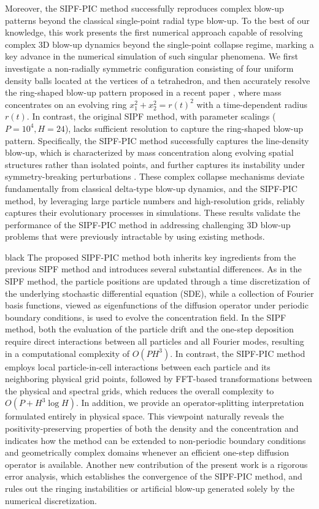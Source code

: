 \documentclass[review,onefignum,onetabnum]{siamart250211}
\begin{document}
Moreover, the SIPF-PIC method successfully reproduces complex blow-up patterns beyond the classical single-point radial type blow-up. To the best of our knowledge, this work presents the first numerical approach capable of resolving complex 3D blow-up dynamics beyond the single-point collapse regime, marking a key advance in the numerical simulation of such singular phenomena. We first investigate a non-radially symmetric configuration consisting of four uniform density balls located at the vertices of a tetrahedron, and then accurately resolve the ring-shaped blow-up pattern proposed in a recent paper \cite{ring_ref}, where mass concentrates on an evolving ring \(x_1^2 + x_2^2 = r(t)^2\) with a time-dependent radius \(r(t)\). In contrast, the original SIPF method, with parameter scalings ($P=10^4, H=24$), lacks sufficient resolution to capture the ring-shaped blow-up pattern. Specifically, the SIPF-PIC method successfully captures the line-density blow-up, which is characterized by mass concentration along evolving spatial structures rather than isolated points, and further captures its instability under symmetry-breaking perturbations \cite{collapsing}. These complex collapse mechanisms deviate fundamentally from classical delta-type blow-up dynamics, and the SIPF-PIC method, by leveraging large particle numbers and high-resolution grids, reliably captures their evolutionary processes in simulations. These results validate the performance of the SIPF-PIC method in addressing challenging 3D blow-up problems that were previously intractable by using existing methods.
  

\begin{color}{black}
The proposed SIPF-PIC method both inherits key ingredients from the previous SIPF method and introduces several substantial differences. As in the SIPF method, the particle positions are updated through a time discretization of the underlying stochastic differential equation (SDE), while a collection of Fourier basis functions, viewed as eigenfunctions of the diffusion operator under periodic boundary conditions, is used to evolve the concentration field. In the SIPF method, both the evaluation of the particle drift and the one-step deposition require direct interactions between all particles and all Fourier modes, resulting in a computational complexity of $O(PH^3)$. In contrast, the SIPF-PIC method employs local particle-in-cell interactions between each particle and its neighboring physical grid points, followed by FFT-based transformations between the physical and spectral grids, which reduces the overall complexity to $O(P+H^3\log H)$. In addition, we provide an operator-splitting interpretation formulated entirely in physical space. This viewpoint naturally reveals the positivity-preserving properties of both the density and the concentration and indicates how the method can be extended to non-periodic boundary conditions and geometrically complex domains whenever an efficient one-step diffusion operator is available. Another new contribution of the present work is a rigorous error analysis, which establishes the convergence of the SIPF-PIC method, and rules out the ringing instabilities or artificial blow-up generated solely by the numerical discretization.  
\end{color}
\end{document}
